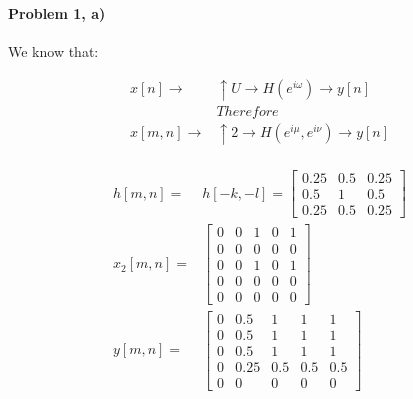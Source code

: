 \documentclass[11pt]{article}
\begin{document}
\MakeScribeTop


\paragraph{\noindent\textbf{\LARGE{Problem 1, a)}}}

\begin{flushleft}
    We know that:
\end{flushleft} 
\begin{equation*}
\begin{split}
    x[n] \rightarrow & \uparrow U \rightarrow H(e^{i\omega}) \rightarrow y[n] \\
    & Therefore \\
    x[m,n] \rightarrow & \uparrow 2 \rightarrow H(e^{i\mu}, e^{i\nu}) \rightarrow y[n] \\
\end{split}
\end{equation*}

\begin{equation*}
\begin{split}
    h[m,n] = & h[-k, -l] = 
    \begin{bmatrix}
        0.25 & 0.5 & 0.25 \\ 
        0.5 & 1 & 0.5 \\
        0.25 & 0.5 & 0.25
    \end{bmatrix} \\
    x_2[m,n] = & 
    \begin{bmatrix}
        0 & 0 & 1 & 0 & 1 \\
        0 & 0 & 0 & 0 & 0 \\ 
        0 & 0 & 1 & 0 & 1 \\
        0 & 0 & 0 & 0 & 0 \\ 
        0 & 0 & 0 & 0 & 0
    \end{bmatrix}   \\
    y[m,n] = &   
    \begin{bmatrix}
        0 & 0.5 & 1 & 1 & 1 \\
        0 & 0.5 & 1 & 1 & 1 \\ 
        0 & 0.5 & 1 & 1 & 1 \\
        0 & 0.25 & 0.5 & 0.5 & 0.5 \\ 
        0 & 0 & 0 & 0 & 0
    \end{bmatrix}     
\end{split}
\end{equation*}
\end{document}
